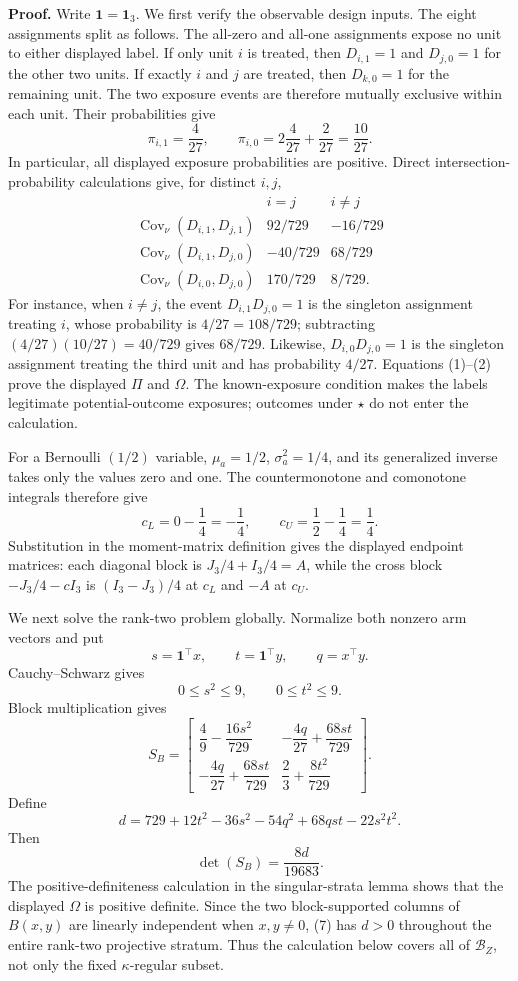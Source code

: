 \textbf{Proof.}
Write \(\mathbf1=\mathbf1_3\).  We first verify the observable design inputs.  The eight assignments split as follows.  The all-zero and all-one assignments expose no unit to either displayed label.  If only unit \(i\) is treated, then \(D_{i,1}=1\) and \(D_{j,0}=1\) for the other two units.  If exactly \(i\) and \(j\) are treated, then \(D_{k,0}=1\) for the remaining unit.  The two exposure events are therefore mutually exclusive within each unit.  Their probabilities give
\[
\pi_{i,1}=\frac4{27},
\qquad
\pi_{i,0}=2\frac4{27}+\frac2{27}=\frac{10}{27}.
\tag{1}
\]
In particular, all displayed exposure probabilities are positive.  Direct intersection-probability calculations give, for distinct \(i,j\),
\[
\begin{array}{c|cc}
&i=j&i\ne j\\ \hline
\operatorname{Cov}_{\nu}(D_{i,1},D_{j,1})&92/729&-16/729\\
\operatorname{Cov}_{\nu}(D_{i,1},D_{j,0})&-40/729&68/729\\
\operatorname{Cov}_{\nu}(D_{i,0},D_{j,0})&170/729&8/729.
\end{array}
\tag{2}
\]
For instance, when \(i\ne j\), the event \(D_{i,1}D_{j,0}=1\) is the singleton assignment treating \(i\), whose probability is \(4/27=108/729\); subtracting \((4/27)(10/27)=40/729\) gives \(68/729\).  Likewise, \(D_{i,0}D_{j,0}=1\) is the singleton assignment treating the third unit and has probability \(4/27\).  Equations (1)--(2) prove the displayed \(\Pi\) and \(\Omega\).  The known-exposure condition makes the labels legitimate potential-outcome exposures; outcomes under \(\star\) do not enter the calculation.

For a Bernoulli \((1/2)\) variable, \(\mu_a=1/2\), \(\sigma_a^2=1/4\), and its generalized inverse takes only the values zero and one.  The countermonotone and comonotone integrals therefore give
\[
c_L=0-\frac14=-\frac14,
\qquad
c_U=\frac12-\frac14=\frac14.
\tag{3}
\]
Substitution in the moment-matrix definition gives the displayed endpoint matrices: each diagonal block is \(J_3/4+I_3/4=A\), while the cross block \(-J_3/4-cI_3\) is \((I_3-J_3)/4\) at \(c_L\) and \(-A\) at \(c_U\).

We next solve the rank-two problem globally.  Normalize both nonzero arm vectors and put
\[
s=\mathbf1^{\top}x,
\qquad t=\mathbf1^{\top}y,
\qquad q=x^{\top}y.
\]
Cauchy--Schwarz gives
\[
0\le s^2\le9,
\qquad 0\le t^2\le9.
\tag{4}
\]
Block multiplication gives
\[
S_B=
\begin{bmatrix}
\dfrac49-\dfrac{16s^2}{729}&-\dfrac{4q}{27}+\dfrac{68st}{729}\\[4pt]
-\dfrac{4q}{27}+\dfrac{68st}{729}&\dfrac23+\dfrac{8t^2}{729}
\end{bmatrix}.
\tag{5}
\]
Define
\[
d=729+12t^2-36s^2-54q^2+68qst-22s^2t^2.
\tag{6}
\]
Then
\[
\det(S_B)=\frac{8d}{19683}.
\tag{7}
\]
The positive-definiteness calculation in the singular-strata lemma shows that the displayed \(\Omega\) is positive definite.  Since the two block-supported columns of \(B(x,y)\) are linearly independent when \(x,y\ne0\), (7) has \(d>0\) throughout the entire rank-two projective stratum.  Thus the calculation below covers all of \(\mathcal B_Z\), not only the fixed \(\kappa\)-regular subset.

